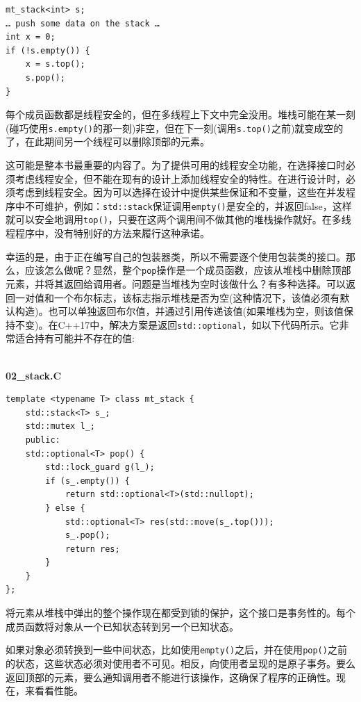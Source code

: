 \begin{lstlisting}[style=styleCXX]
mt_stack<int> s;
… push some data on the stack …
int x = 0;
if (!s.empty()) {
	x = s.top();
	s.pop();
}
\end{lstlisting}

每个成员函数都是线程安全的，但在多线程上下文中完全没用。堆栈可能在某一刻(碰巧使用\texttt{s.empty()}的那一刻)非空，但在下一刻(调用\texttt{s.top()}之前)就变成空的了，在此期间另一个线程可以删除顶部的元素。

这可能是整本书最重要的内容了。为了提供可用的线程安全功能，在选择接口时必须考虑线程安全，但不能在现有的设计上添加线程安全的特性。在进行设计时，必须考虑到线程安全。因为可以选择在设计中提供某些保证和不变量，这些在并发程序中不可维护，例如：\texttt{std::stack}保证调用\texttt{empty()}是安全的，并返回false，这样就可以安全地调用\texttt{top()}，只要在这两个调用间不做其他的堆栈操作就好。在多线程程序中，没有特别好的方法来履行这种承诺。

幸运的是，由于正在编写自己的包装器类，所以不需要逐个使用包装类的接口。那么，应该怎么做呢？显然，整个\texttt{pop}操作是一个成员函数，应该从堆栈中删除顶部元素，并将其返回给调用者。问题是当堆栈为空时该做什么？有多种选择。可以返回一对值和一个布尔标志，该标志指示堆栈是否为空(这种情况下，该值必须有默认构造)。也可以单独返回布尔值，并通过引用传递该值(如果堆栈为空，则该值保持不变)。在C++17中，解决方案是返回\texttt{std::optional}，如以下代码所示。它非常适合持有可能并不存在的值:

\hspace*{\fill} \\ %
\noindent
\textbf{02\_stack.C}
\begin{lstlisting}[style=styleCXX]
template <typename T> class mt_stack {
	std::stack<T> s_;
	std::mutex l_;
	public:
	std::optional<T> pop() {
		std::lock_guard g(l_);
		if (s_.empty()) {
			return std::optional<T>(std::nullopt);
		} else {
			std::optional<T> res(std::move(s_.top()));
			s_.pop();
			return res;
		}
	}
};
\end{lstlisting}

将元素从堆栈中弹出的整个操作现在都受到锁的保护，这个接口是事务性的。每个成员函数将对象从一个已知状态转到另一个已知状态。

如果对象必须转换到一些中间状态，比如使用\texttt{empty()}之后，并在使用\texttt{pop()}之前的状态，这些状态必须对使用者不可见。相反，向使用者呈现的是原子事务。要么返回顶部的元素，要么通知调用者不能进行该操作，这确保了程序的正确性。现在，来看看性能。


